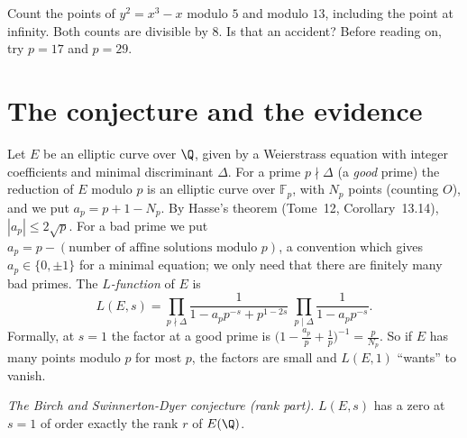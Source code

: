 \begin{think}
Count the points of $y^2=x^3-x$ modulo $5$ and modulo $13$, including the point at infinity. Both counts are divisible by $8$. Is that an accident? Before
reading on, try $p=17$ and $p=29$.
\end{think}

\section{The conjecture and the evidence}

Let $E$ be an elliptic curve over $\Q$, given by a Weierstrass equation with integer coefficients and minimal discriminant $\Delta$. For a prime $p\nmid\Delta$
(a \emph{good} prime) the reduction of $E$ modulo $p$ is an elliptic curve over $\mathbb F_p$, with $N_p$ points (counting $O$), and we put $a_p=p+1-N_p$. By
Hasse's theorem (Tome~12, Corollary~13.14), $|a_p|\le2\sqrt p$. For a bad prime we put $a_p=p-(\text{number of affine solutions modulo }p)$, a convention
which gives $a_p\in\{0,\pm1\}$ for a minimal equation; we only need that there are finitely many bad primes. The \emph{$L$-function} of $E$ is
\[
L(E,s)=\prod_{p\nmid\Delta}\frac1{1-a_pp^{-s}+p^{1-2s}}\;\prod_{p\mid\Delta}\frac1{1-a_pp^{-s}} .
\]
Formally, at $s=1$ the factor at a good prime is $\bigl(1-\frac{a_p}p+\frac1p\bigr)^{-1}=\frac p{N_p}$. So if $E$ has many points modulo $p$ for most $p$, the
factors are small and $L(E,1)$ ``wants'' to vanish.

\begin{center}
\emph{The Birch and Swinnerton-Dyer conjecture (rank part).} $L(E,s)$ has a zero at $s=1$ of order exactly the rank $r$ of $E(\Q)$.
\end{center}

